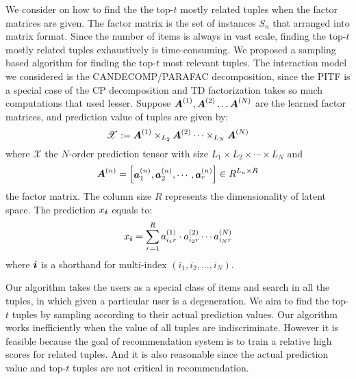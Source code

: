 \documentclass[letterpaper]{article}
\newcommand{\Sca}[3]{{#1}^{(#2)}_{i_#2#3}}%
\newcommand{\anr}[2]{\Sca{a}{#1}{#2}}
\newcommand{\T}[1]{\boldsymbol{\mathscr{{#1}}}}
\newcommand{\V}[1]{{\bm{{\MakeLowercase{#1}}}}}
\newcommand{\VnC}[3]{\V{#1}^{(#2)}_{#3}}
\newcommand{\M}[1]{{\bm{{\MakeUppercase{#1}}}}}
\newcommand{\Mn}[2]{\M{#1}^{(#2)}}
\newcommand{\coord}{(i_1,i_2,\ldots,i_N)}
\begin{document}
We consider on how to find the the top-$t$ mostly related tuples when the factor matrices are given.
The factor matrix is the set of instances $S_n$ that arranged into matrix format.
Since the number of items is always in vast scale,
finding the top-$t$ mostly related tuples exhaustively is time-consuming.
We proposed a sampling based algorithm for finding the top-$t$ most relevant tuples.
The interaction model we considered is the CANDECOMP/PARAFAC decomposition\cite{KoBa09},
since the PITF is a special case of the CP decomposition
and TD factorization takes so much computations that used lesser.
Suppose $\Mn{A}{1},\Mn{A}{2}\ldots\Mn{A}{N}$ are the learned factor matrices,
and prediction value of tuples are given by:
\begin{equation}\label{eq:CPDecomposition}
    \T{X} := \Mn{A}{1}\times_{L_2}\Mn{A}{2}\cdots\times_{L_N}\Mn{A}{N}
\end{equation}
where $\T{X}$ the $N$-order prediction tensor with size
$L_1\times L_2\times\cdots\times L_N$ and
\[
\M{A}^{(n)} =
\begin{bmatrix}
    \VnC{a}{n}{1},\VnC{a}{n}{2},\cdots,\VnC{a}{n}{r}
\end{bmatrix}  \in R^{L_n\times R}
\]
the factor matrix. The column size $R$ represents the dimensionality of latent space.
The prediction $x_\V{i}$ equals to:
\begin{equation}\label{eq:ValueInTensor}
    x_\V{i} = \sum_{r=1}^{R}\anr{1}{r}\cdot\anr{2}{r}\cdots\anr{N}{r}
\end{equation}
where $\V{i}$ is a shorthand for multi-index $\coord$.

Our algorithm takes the users as a special class of items and search in all the tuples,
in which given a particular user is a degeneration.
We aim to find the top-$t$ tuples by sampling according to their actual prediction values.
Our algorithm works inefficiently when the value of all tuples are indiscriminate.
However it is feasible because the goal of recommendation system is to train a relative
high scores for related tuples.
And it is also reasonable since the actual prediction value and
top-$t$ tuples are not critical in recommendation.

\end{document}
